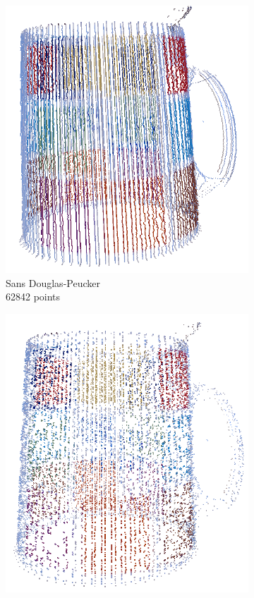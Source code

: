 \documentclass[a4paper,10pt]{report}
\begin{document}
\begin{figure}[h!]
	\centering
    \begin{subfigure}[b]{0.3\textwidth}
	    \includegraphics[width=\textwidth]{results/nodp-pointcloud.png}
        \caption{Sans Douglas-Peucker\\62842 points}
    \end{subfigure}
    \begin{subfigure}[b]{0.3\textwidth}
	    \includegraphics[width=\textwidth]{results/dp05-pointcloud.png}

\end{subfigure}
\end{figure}
\end{document}
